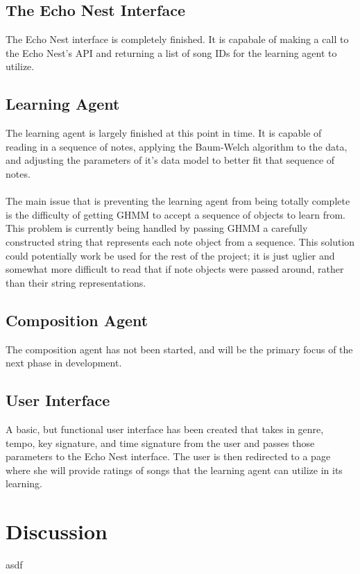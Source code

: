 \documentclass{article}
\begin{document}
\subsection{The Echo Nest Interface}
The Echo Nest interface is completely finished.  It is capabale of making a call to the Echo Nest's API and
returning a list of song IDs for the learning agent to utilize.

\subsection{Learning Agent}
The learning agent is largely finished at this point in time. It is capable of reading in a sequence
of notes, applying the Baum-Welch algorithm to the data, and adjusting the parameters of it's data
model to better fit that sequence of notes.\\
\\
The main issue that is preventing the learning agent from being totally complete is the difficulty
of getting GHMM to accept a sequence of objects to learn from. This problem is currently being
handled by passing GHMM a carefully constructed string that represents each note object from a 
sequence. This solution could potentially work be used for the rest of the project; it is just
uglier and somewhat more difficult to read that if note objects were passed around, rather than
their string representations.

\subsection{Composition Agent}
The composition agent has not been started, and will be the primary focus of the next phase in development.

\subsection{User Interface}
A basic, but functional user interface has been created that takes in genre, tempo, key signature, and time
signature from the user and passes those parameters to the Echo Nest interface. The user is then redirected
to a page where she will provide ratings of songs that the learning agent can utilize in its learning.

\section{Discussion}
asdf
\end{document}

